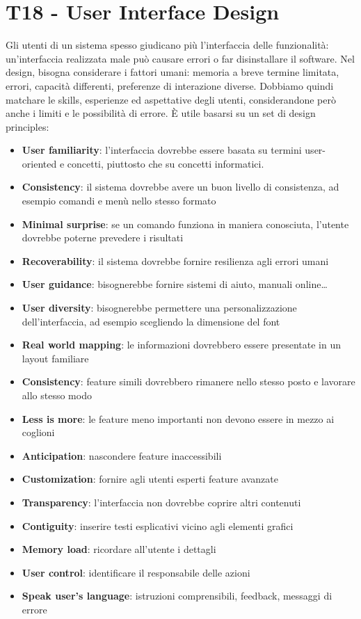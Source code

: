 \documentclass[11pt]{article}
\begin{document}
\section{T18 - User Interface Design}
Gli utenti di un sistema spesso giudicano più l'interfaccia delle funzionalità: un'interfaccia realizzata male può causare errori o far disinstallare il software. Nel design, bisogna considerare i fattori umani: memoria a breve termine limitata, errori, capacità differenti, preferenze di interazione diverse. Dobbiamo quindi matchare le skills, esperienze ed aspettative degli utenti, considerandone però anche i limiti e le possibilità di errore. È utile basarsi su un set di design principles:
\begin{itemize}
    \item \textbf{User familiarity}: l'interfaccia dovrebbe essere basata su termini user-oriented e concetti, piuttosto che su concetti informatici.
    \item \textbf{Consistency}: il sistema dovrebbe avere un buon livello di consistenza, ad esempio comandi e menù nello stesso formato
    \item \textbf{Minimal surprise}: se un comando funziona in maniera conosciuta, l'utente dovrebbe poterne prevedere i risultati 
    \item \textbf{Recoverability}: il sistema dovrebbe fornire resilienza agli errori umani
    \item \textbf{User guidance}: bisognerebbe fornire sistemi di aiuto, manuali online\dots
    \item \textbf{User diversity}: bisognerebbe permettere una personalizzazione dell'interfaccia, ad esempio scegliendo la dimensione del font 
    \item \textbf{Real world mapping}: le informazioni dovrebbero essere presentate in un layout familiare
    \item \textbf{Consistency}: feature simili dovrebbero rimanere nello stesso posto e lavorare allo stesso modo 
    \item \textbf{Less is more}: le feature meno importanti non devono essere in mezzo ai coglioni
    \item \textbf{Anticipation}: nascondere feature inaccessibili
    \item \textbf{Customization}: fornire agli utenti esperti feature avanzate
    \item \textbf{Transparency}: l'interfaccia non dovrebbe coprire altri contenuti 
    \item \textbf{Contiguity}: inserire testi esplicativi vicino agli elementi grafici 
    \item \textbf{Memory load}: ricordare all'utente i dettagli 
    \item \textbf{User control}: identificare il responsabile delle azioni
    \item \textbf{Speak user's language}: istruzioni comprensibili, feedback, messaggi di errore 
\end{itemize}
\end{document}

